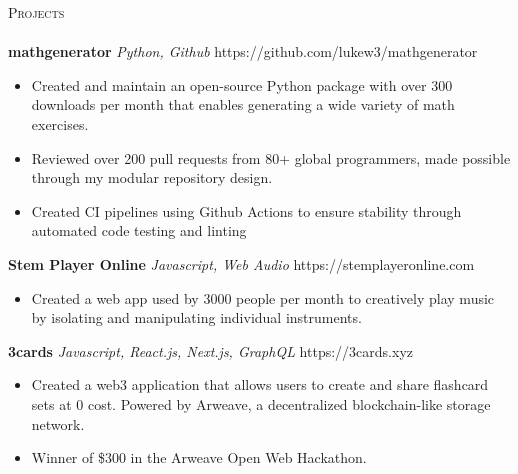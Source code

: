 \documentclass[letterpaper]{article}
\newcommand{\lineunder} {
    \vspace*{-8pt} \\
    \hspace*{-18pt} \hrulefill \\
}
\newcommand{\header} [1] {
    {\hspace*{-18pt}\vspace*{6pt} \textsc{#1}}
    \vspace*{-6pt} \lineunder
}
\begin{document}
\header{Projects}

    {\textbf{mathgenerator}} {\sl Python, Github} \hfill https://github.com/lukew3/mathgenerator\\
    \vspace*{-3mm}
    \begin{itemize} \itemsep -1pt
    
        \item Created and maintain an open-source Python package with over 300 downloads per month that enables generating a wide variety of math exercises.

        \item Reviewed over 200 pull requests from 80+ global programmers, made possible through my modular repository design.

        \item Created CI pipelines using Github Actions to ensure stability through automated code testing and linting
    
    \end{itemize}
    \vspace*{-2mm}

    {\textbf{Stem Player Online}} {\sl Javascript, Web Audio} \hfill https://stemplayeronline.com\\
    \vspace*{-3mm}
    \begin{itemize} \itemsep -1pt

        \item Created a web app used by 3000 people per month to creatively play music by isolating and manipulating individual instruments.
        
    \end{itemize}
    \vspace*{-2mm}

    {\textbf{3cards}} {\sl Javascript, React.js, Next.js, GraphQL} \hfill https://3cards.xyz\\
    \vspace*{-3mm}
    \begin{itemize} \itemsep -1pt

        \item Created a web3 application that allows users to create and share flashcard sets at 0 cost. Powered by Arweave, a decentralized blockchain-like storage network.
        \item Winner of \$300 in the Arweave Open Web Hackathon.
        
    \end{itemize}
    \vspace*{-2mm}
\end{document}
